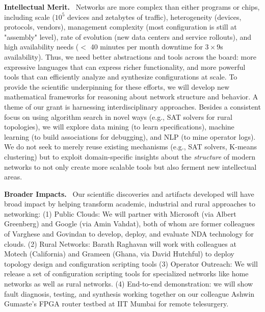 \documentclass[10pt]{article}
\begin{document}
\smallskip
\noindent\textbf{Intellectual Merit.}~
%
Networks are more complex  than either programs or chips, including scale ($10^5$ devices and zetabytes of traffic), heterogeneity (devices, protocols, vendors), management complexity (most configuration is still at "assembly" level), rate of evolution (new data centers and service rollouts), and high availability needs ($<$ 40 minutes per month downtime for $3 \times 9$s availability). Thus, we need better abstractions and tools across the board: more expressive languages that can express richer functionality, and more powerful tools that can efficiently analyze and synthesize configurations at scale. To provide the scientific underpinning for these efforts, we will develop new mathematical frameworks for reasoning about network structure and behavior. A theme of our grant is harnessing interdisciplinary approaches.  Besides a consistent focus on using algorithm search in novel ways (e.g., SAT solvers for rural topologies),
we will explore data mining (to learn specifications), machine learning (to build associations for debugging),
and NLP (to mine operator logs).  We do not seek to merely reuse existing
mechanisms (e.g., SAT solvers, K-means clustering) but to exploit domain-specific insights about the {\em structure} of modern networks to not only create more scalable tools but also ferment new intellectual areas.

\smallskip
\noindent\textbf{Broader Impacts.}~
Our scientific discoveries and artifacts developed will have broad impact by helping transform academic, industrial and rural approaches to networking:
(1) Public Clouds: We will partner with Microsoft (via Albert Greenberg) and Google (via Amin Vahdat), both of whom are former colleagues of Varghese and Govindan to develop, deploy, and evaluate NDA technology for clouds. (2) Rural Networks: Barath Raghavan will work with colleagues at Motech (California) and Grameen (Ghana, via
David Hutchful) to deploy topology design and configuration scripting tools (3) Operator Outreach: We will release a set of configuration scripting tools for
specialized networks like home networks as well as rural networks. (4) End-to-end demonstration:  we will show fault diagnosis, testing, and synthesis working together on 
our colleague Ashwin Gumaste's FPGA router testbed at IIT Mumbai for remote telesurgery.
\end{document}

